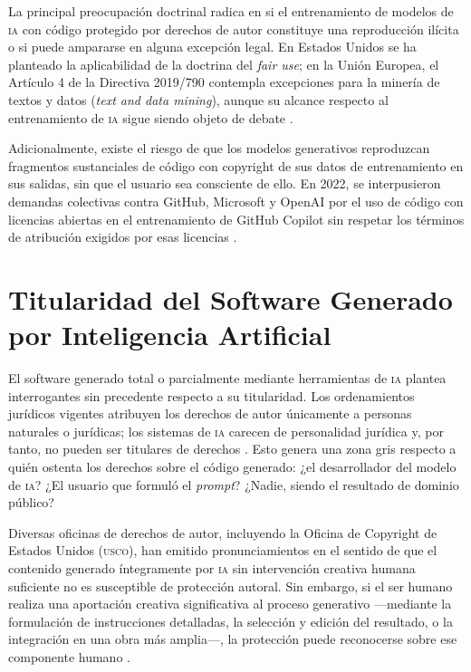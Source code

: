 \documentclass[11pt,a4paper]{report}
\begin{document}
La principal preocupación doctrinal radica en si el entrenamiento de modelos de \textsc{ia} con código protegido por derechos de autor constituye una reproducción ilícita o si puede ampararse en alguna excepción legal. En Estados Unidos se ha planteado la aplicabilidad de la doctrina del \textit{fair use}; en la Unión Europea, el Artículo 4 de la Directiva 2019/790 contempla excepciones para la minería de textos y datos (\textit{text and data mining}), aunque su alcance respecto al entrenamiento de \textsc{ia} sigue siendo objeto de debate \citep{euipo2022, openai2025}.

Adicionalmente, existe el riesgo de que los modelos generativos reproduzcan fragmentos sustanciales de código con copyright de sus datos de entrenamiento en sus salidas, sin que el usuario sea consciente de ello. En 2022, se interpusieron demandas colectivas contra GitHub, Microsoft y OpenAI por el uso de código con licencias abiertas en el entrenamiento de GitHub Copilot sin respetar los términos de atribución exigidos por esas licencias \citep{github2024}.

\section{Titularidad del Software Generado por Inteligencia Artificial}

El software generado total o parcialmente mediante herramientas de \textsc{ia} plantea interrogantes sin precedente respecto a su titularidad. Los ordenamientos jurídicos vigentes atribuyen los derechos de autor únicamente a personas naturales o jurídicas; los sistemas de \textsc{ia} carecen de personalidad jurídica y, por tanto, no pueden ser titulares de derechos \citep{ompi2024}. Esto genera una zona gris respecto a quién ostenta los derechos sobre el código generado: ¿el desarrollador del modelo de \textsc{ia}? ¿El usuario que formuló el \textit{prompt}? ¿Nadie, siendo el resultado de dominio público?

Diversas oficinas de derechos de autor, incluyendo la Oficina de Copyright de Estados Unidos (\textsc{usco}), han emitido pronunciamientos en el sentido de que el contenido generado íntegramente por \textsc{ia} sin intervención creativa humana suficiente no es susceptible de protección autoral. Sin embargo, si el ser humano realiza una aportación creativa significativa al proceso generativo —mediante la formulación de instrucciones detalladas, la selección y edición del resultado, o la integración en una obra más amplia—, la protección puede reconocerse sobre ese componente humano \citep{ompi2024, openai2025}.
\end{document}
